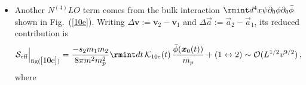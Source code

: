 \begin{itemize}
\begin{align}
    \begin{split}
\mathcal{S}_{\text{eff}}\Big|_{\text{fig}(\ref{10d})}
=\frac{m_1 m_2 g_1 s_2}{16 \pi m_p^2}\rmint dt \,
\mathcal{K}_{10d}(t)\,
\frac{\Bar{\phi}(\boldsymbol{x}_1(t))}{m_p}+ T(\Dot{\Bar{\phi}})+ (1 \leftrightarrow 2)\,\sim\mathcal{O}(L^{1/2}v^{9/2})\,.
\label{5.26}
    \end{split}
\end{align}
with
\begin{align}
    \begin{split}
        \mathcal{K}_{10d}(t)=e^{-mr}\Bigg[
        \frac{\boldsymbol{v}_1\cdot\boldsymbol{v}_2}{r}
        -\frac{(\boldsymbol{v}_1\cdot \hat{n})(\boldsymbol{v}_2\cdot \hat{n})}{r}
        +\frac{m}{2}\,(\boldsymbol{v}_2\cdot \Hat{n})(\boldsymbol{v}_1\cdot \hat{n})
        \Bigg].
    \end{split}
\end{align}
Here, 
\begin{align}
    \begin{split}
        T(\Dot{\Bar{\phi}})&=-\frac{m_1 m_2 g_1 s_2}{16\pi m_p^2}\rmint dt\, e^{-mr}(\boldsymbol{v}_2\cdot \Hat{n})\frac{ \Dot{\Bar{\phi}}(\boldsymbol{x}_1(t))}{m_p},\\ &
        =\frac{m_1 m_2 g_1 s_2}{16\pi m_p^2}\rmint dt \frac{e^{-mr}}{r}(\boldsymbol{v}_2\cdot \Dot{\boldsymbol{r}}+\Vec{a}_2\cdot \boldsymbol{r})\,\frac{\Bar{\phi}(\boldsymbol{x}_1(t))}{m_p}\,.
    \end{split}
\end{align}
We have ignored the total derivative term by assuming the time variation of $\Bar{\phi}$ is very small and $|\Dot{\boldsymbol{r}}|=0$ for circular orbits.
\item Another $N^{(4)}LO$ term comes from the bulk interaction $\rmint d^4x \psi\partial_0\phi\partial_0\bar{\phi}$ shown in Fig.~(\ref{10e}). Writing $\Delta\boldsymbol{v}:=\boldsymbol{v}_2-\boldsymbol{v}_1$ and $\Delta\Vec{a}:=\Vec{a}_2-\Vec{a}_1$, its reduced contribution is
\begin{align}
    \begin{split}
\mathcal{S}_{\text{eff}}\Big |_{\text{fig}(\ref{10e})}
=\frac{-s_2m_1m_2}{8\pi m^2 m_p^2}\rmint dt \,
\mathcal{K}_{10e}(t)\,
\frac{\bar\phi(\boldsymbol{x}_0(t))}{m_p}+(1\leftrightarrow 2)\sim\mathcal{O}(L^{1/2}v^{9/2})\,,
\label{5.29}
    \end{split}
\end{align}
where
\begin{align}

\end{align}
\end{itemize}

